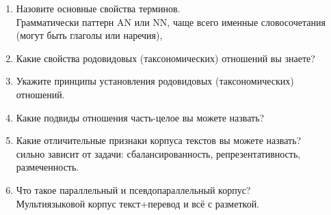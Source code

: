 \documentclass[a4paper]{article}
\begin{document}
\begin{enumerate}
	\item Назовите основные свойства терминов.\hfill\\
	Грамматически паттерн AN или NN, чаще всего именные словосочетания (могут быть глаголы или наречия),

	\item Какие свойства родовидовых (таксономических) отношений вы знаете?\hfill\\
	\item Укажите принципы установления родовидовых (таксономических) отношений.\hfill\\
	\item Какие подвиды отношения часть-целое вы можете назвать?\hfill\\

	\item Какие отличительные признаки корпуса текстов вы можете назвать?\hfill\\
	сильно зависит от задачи: сбалансированность, репрезентативность, размеченность.

	\item Что такое параллельный и псевдопараллельный корпус?\hfill\\
	Мультиязыковой корпус текст+перевод и всё с разметкой.


\end{enumerate}
\end{document}
